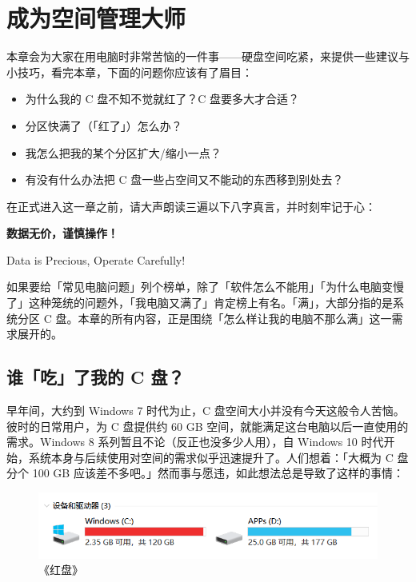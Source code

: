 \chapter{成为空间管理大师}
\label{cha:manage-storage}

\begin{intro}
  本章会为大家在用电脑时非常苦恼的一件事——硬盘空间吃紧，来提供一些建议与小技巧，看完本章，下面的问题你应该有了眉目：
  \begin{itemize}
    \item 为什么我的 C 盘不知不觉就红了？C 盘要多大才合适？
    \item 分区快满了（「红了」）怎么办？
    \item 我怎么把我的某个分区扩大/缩小一点？
    \item 有没有什么办法把 C 盘一些占空间又不能动的东西移到别处去？
  \end{itemize}
\end{intro}

在正式进入这一章之前，请大声朗读三遍以下八字真言，并时刻牢记于心：
\begin{center}
  \LARGE\bfseries
  数据无价，谨慎操作！\par
  Data is Precious, Operate Carefully!
\end{center}

如果要给「常见电脑问题」列个榜单，除了「软件怎么不能用」「为什么电脑变慢了」这种笼统的问题外，「我电脑又满了」肯定榜上有名。「满」，大部分指的是系统分区 C 盘。本章的所有内容，正是围绕「怎么样让我的电脑不那么满」这一需求展开的。

\section{谁「吃」了我的 C 盘？}

早年间，大约到 Windows 7 时代为止，C 盘空间大小并没有今天这般令人苦恼。彼时的日常用户，为 C 盘提供约 60 GB 空间，就能满足这台电脑以后一直使用的需求。Windows 8 系列暂且不论（反正也没多少人用），自 Windows 10 时代开始，系统本身与后续使用对空间的需求似乎迅速提升了。人们想着：「大概为 C 盘分个 100 GB 应该差不多吧。」然而事与愿违，如此想法总是导致了这样的事情：

\begin{figure}[htb!]
  \centering
  \includegraphics[width=.8\textwidth]{assets/advanced/Red_C_Drive.png}
  \caption{《红盘》}
  \label{fig:Red_C_Drive}
\end{figure}

